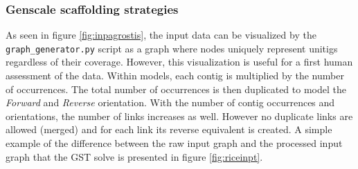 \documentclass[12pt, twocolumn]{article}
\begin{document}
\newpage
\subsubsection{Genscale scaffolding strategies}
As seen in figure \ref{fig:inpagrostis}, the input data can be visualized by the \texttt{graph\_generator.py} script as a graph where nodes uniquely represent unitigs regardless of their coverage. However, this visualization is useful for a first human assessment of the data. Within models, each contig is multiplied by the number of occurrences. The total number of occurrences is then duplicated to model the \textit{Forward} and \textit{Reverse} orientation. With the number of contig occurrences and orientations, the number of links increases as well. However no duplicate links are allowed (merged) and for each link its reverse equivalent is created. A simple example of the difference between the raw input graph and the processed input graph that the GST solve is presented in figure \ref{fig:riceinpt}.

\begin{figure}[h!]
\centering
{}
\end{figure}
\end{document}
